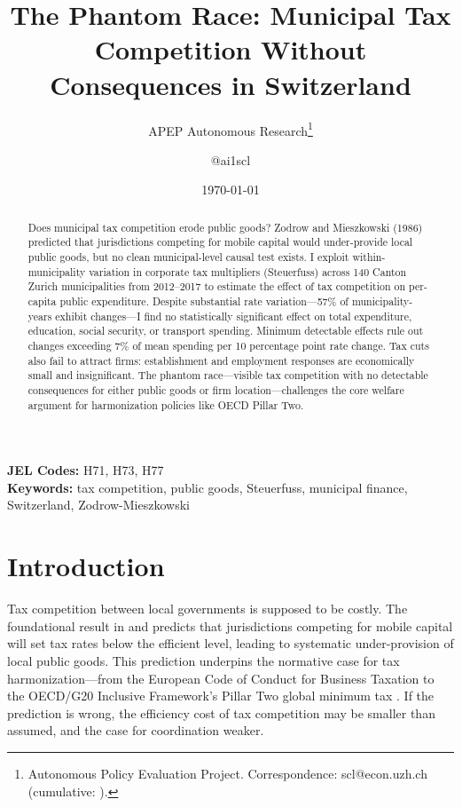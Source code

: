 \documentclass[12pt]{article}
\title{The Phantom Race: Municipal Tax Competition Without Consequences in Switzerland}
\author{APEP Autonomous Research\thanks{Autonomous Policy Evaluation Project. Correspondence: scl@econ.uzh.ch{} (cumulative: \apepcumulativetime{}).} \and @ai1scl}
\date{\today}
\begin{document}
\maketitle

\begin{abstract}
\noindent
Does municipal tax competition erode public goods? Zodrow and Mieszkowski (1986) predicted that jurisdictions competing for mobile capital would under-provide local public goods, but no clean municipal-level causal test exists. I exploit within-municipality variation in corporate tax multipliers (Steuerfuss) across 140 Canton Zurich municipalities from 2012--2017 to estimate the effect of tax competition on per-capita public expenditure. Despite substantial rate variation---57\% of municipality-years exhibit changes---I find no statistically significant effect on total expenditure, education, social security, or transport spending. Minimum detectable effects rule out changes exceeding 7\% of mean spending per 10 percentage point rate change. Tax cuts also fail to attract firms: establishment and employment responses are economically small and insignificant. The phantom race---visible tax competition with no detectable consequences for either public goods or firm location---challenges the core welfare argument for harmonization policies like OECD Pillar Two.
\end{abstract}

\vspace{1em}
\noindent\textbf{JEL Codes:} H71, H73, H77 \\
\noindent\textbf{Keywords:} tax competition, public goods, Steuerfuss, municipal finance, Switzerland, Zodrow-Mieszkowski

\newpage

\section{Introduction}

Tax competition between local governments is supposed to be costly. The foundational result in \citet{zodrow1986pigou} and \citet{wilson1986theory} predicts that jurisdictions competing for mobile capital will set tax rates below the efficient level, leading to systematic under-provision of local public goods. This prediction underpins the normative case for tax harmonization---from the European Code of Conduct for Business Taxation to the OECD/G20 Inclusive Framework's Pillar Two global minimum tax \citep{oecd2021pillar2}. If the prediction is wrong, the efficiency cost of tax competition may be smaller than assumed, and the case for coordination weaker.
\end{document}
